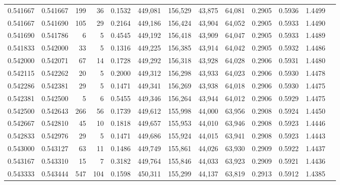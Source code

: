 \begin{tabular}{rrrrrrrrrrrrr}
0.541667 & 0.541667 &   199 &  36 &                                     0.1532 & 449,081 & 156,529 &  43,875 &  64,081 & 0.2905 & 0.5936 & 1.4499 \\
0.541667 & 0.541690 &   105 &  29 &                                     0.2164 & 449,186 & 156,424 &  43,904 &  64,052 & 0.2905 & 0.5933 & 1.4490 \\
0.541690 & 0.541786 &     6 &   5 &                                     0.4545 & 449,192 & 156,418 &  43,909 &  64,047 & 0.2905 & 0.5933 & 1.4489 \\
0.541833 & 0.542000 &    33 &   5 &                                     0.1316 & 449,225 & 156,385 &  43,914 &  64,042 & 0.2905 & 0.5932 & 1.4486 \\
0.542000 & 0.542071 &    67 &  14 &                                     0.1728 & 449,292 & 156,318 &  43,928 &  64,028 & 0.2906 & 0.5931 & 1.4480 \\
0.542115 & 0.542262 &    20 &   5 &                                     0.2000 & 449,312 & 156,298 &  43,933 &  64,023 & 0.2906 & 0.5930 & 1.4478 \\
0.542286 & 0.542381 &    29 &   5 &                                     0.1471 & 449,341 & 156,269 &  43,938 &  64,018 & 0.2906 & 0.5930 & 1.4475 \\
0.542381 & 0.542500 &     5 &   6 &                                     0.5455 & 449,346 & 156,264 &  43,944 &  64,012 & 0.2906 & 0.5929 & 1.4475 \\
0.542500 & 0.542643 &   266 &  56 &                                     0.1739 & 449,612 & 155,998 &  44,000 &  63,956 & 0.2908 & 0.5924 & 1.4450 \\
0.542667 & 0.542810 &    45 &  10 &                                     0.1818 & 449,657 & 155,953 &  44,010 &  63,946 & 0.2908 & 0.5923 & 1.4446 \\
0.542833 & 0.542976 &    29 &   5 &                                     0.1471 & 449,686 & 155,924 &  44,015 &  63,941 & 0.2908 & 0.5923 & 1.4443 \\
0.543000 & 0.543127 &    63 &  11 &                                     0.1486 & 449,749 & 155,861 &  44,026 &  63,930 & 0.2909 & 0.5922 & 1.4437 \\
0.543167 & 0.543310 &    15 &   7 &                                     0.3182 & 449,764 & 155,846 &  44,033 &  63,923 & 0.2909 & 0.5921 & 1.4436 \\
0.543333 & 0.543444 &   547 & 104 &                                     0.1598 & 450,311 & 155,299 &  44,137 &  63,819 & 0.2913 & 0.5912 & 1.4385 \\

\end{tabular}
